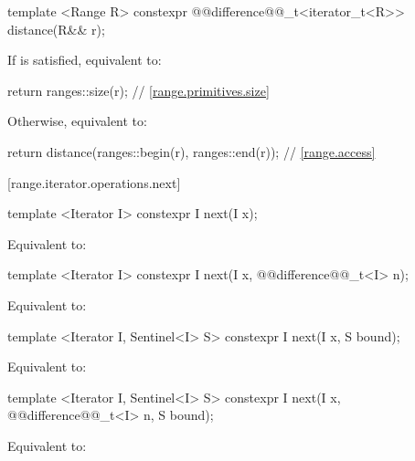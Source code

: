 \begin{itemdecl}
template <Range R>
  constexpr @@difference@@_t<iterator_t<R>> distance(R&& r);
\end{itemdecl}

\begin{itemdescr}
\pnum
\effects
If  is satisfied, equivalent to:
\begin{codeblock}
return ranges::size(r); // \ref{range.primitives.size}
\end{codeblock}
Otherwise, equivalent to:
\begin{codeblock}
return distance(ranges::begin(r), ranges::end(r)); // \ref{range.access}
\end{codeblock}
\end{itemdescr}

[range.iterator.operations.next]{}
%

\begin{itemdecl}
template <Iterator I>
  constexpr I next(I x);
\end{itemdecl}

\begin{itemdescr}
\pnum
\effects Equivalent to: 
\end{itemdescr}

\begin{itemdecl}
template <Iterator I>
  constexpr I next(I x, @@difference@@_t<I> n);
\end{itemdecl}

\begin{itemdescr}
\pnum
\effects Equivalent to: 
\end{itemdescr}

\begin{itemdecl}
template <Iterator I, Sentinel<I> S>
  constexpr I next(I x, S bound);
\end{itemdecl}

\begin{itemdescr}
\pnum
\effects Equivalent to: 
\end{itemdescr}

\begin{itemdecl}
template <Iterator I, Sentinel<I> S>
  constexpr I next(I x, @@difference@@_t<I> n, S bound);
\end{itemdecl}

\begin{itemdescr}
\pnum
\effects Equivalent to: 
\end{itemdescr}

